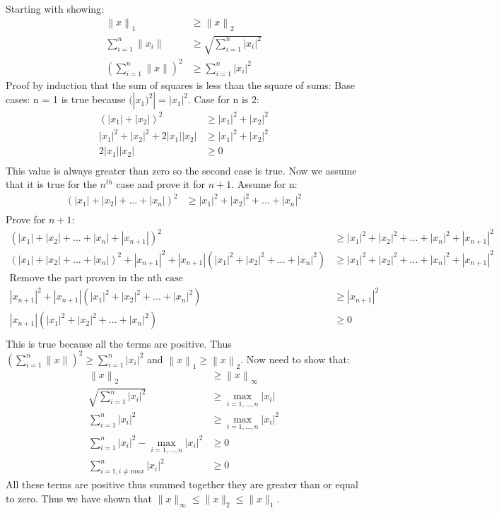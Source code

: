\documentclass{article}
\newcommand{\1}{\mathbf{1}}
\newcommand{\norm}[1]{\left\|#1\right\|}
\begin{document}
Starting with showing:
\begin{align}
    \norm{x}_1 & \ge \norm{x}_2 \\
    \sum_{i=1}^n \|x_i\| & \ge  \sqrt{\sum_{i=1}^n |x_i|^2} \\
    (\sum_{i=1}^n \|x\|)^2 & \ge  \sum_{i=1}^n |x_i|^2
\end{align}
Proof by induction that the sum of squares is less than the square of sums:
Base cases: n = 1 is true because $(|x_1)^2| =  |x_1|^2 $. Case for n is 2:
\begin{align}
    ( |x_1| + |x_2|)^2 & \ge |x_1|^2 + |x_2|^2 \\
    |x_1|^2 + |x_2|^2 + 2|x_1||x_2| & \ge |x_1|^2 + |x_2|^2 \\
        2|x_1||x_2| & \ge 0\\
\end{align}
This value is always greater than zero so the second case is true. Now we assume that it is true for the $n^{th}$ case and prove it for $n+1$. 
Assume for n:
\begin{align}
    ( |x_1| + |x_2| + ... + |x_n|)^2 & \ge |x_1|^2 + |x_2|^2  + ... + |x_n|^2 \\
\end{align}
Prove for $n+1$: 
\begin{align}
    ( |x_1| + |x_2| + ... + |x_n| + |x_{n+1}|)^2 & \ge |x_1|^2 + |x_2|^2  + ... + |x_n|^2 + |x_{n+1}|^2 \\
    ( |x_1| + |x_2| + ... + |x_n|)^2 + |x_{n+1}|^2 + |x_{n+1}|(|x_1|^2 + |x_2|^2  + ... + |x_n|^2)  & \ge |x_1|^2 + |x_2|^2  + ... + |x_n|^2 + |x_{n+1}|^2 \\
    \text{Remove the part proven in the nth case} \\
    |x_{n+1}|^2 + |x_{n+1}|(|x_1|^2 + |x_2|^2  + ... + |x_n|^2)  & \ge  |x_{n+1}|^2 \\
   |x_{n+1}|(|x_1|^2 + |x_2|^2  + ... + |x_n|^2)  & \ge 0 \\
\end{align}
This is true because all the terms are positive. Thus $(\sum_{i=1}^n \|x\|)^2 \ge \sum_{i=1}^n |x_i|^2 $ and $\norm{x}_1 \ge \norm{x}_2$.
Now need to show that:
\begin{align}
    \norm{x}_2 & \ge \norm{x}_{\infty} \\
    \sqrt{\sum_{i=1}^n |x_i|^2} & \ge  \max_{i=1,\dots,n} |x_i| \\
    \sum_{i=1}^n |x_i|^2 & \ge  \max_{i=1,\dots,n} |x_i|^2  \\
    \sum_{i=1}^n |x_i|^2 - \max_{i=1,\dots,n} |x_i|^2 & \ge  0  \\
    \sum_{i=1, i\ne max}^n |x_i|^2 & \ge  0  
\end{align}
All these terms are positive thus summed together they are greater than or equal to zero. 
Thus we have shown that $\|x\|_\infty \leq \|x\|_2 \leq \|x\|_1$.\\
\end{document}
